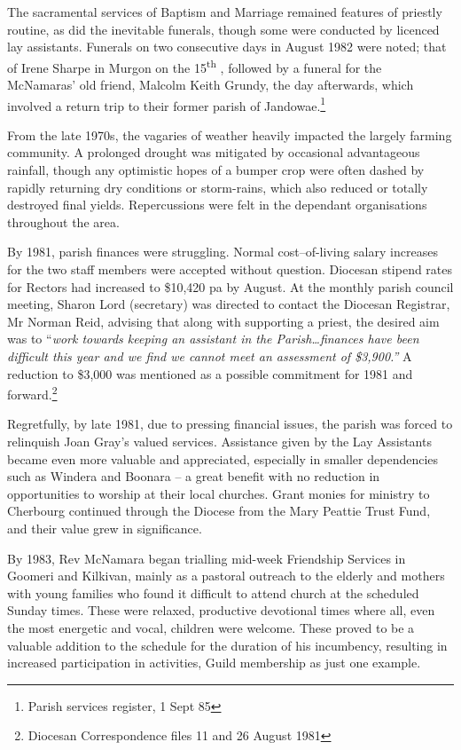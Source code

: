 The sacramental services of Baptism and Marriage remained features of priestly routine, as did the inevitable funerals, though some were conducted by licenced lay assistants. Funerals on two consecutive days in August 1982 were noted; that of Irene Sharpe in Murgon on the 15\textsuperscript{th} , followed by a funeral for the McNamaras' old friend, Malcolm Keith Grundy, the day afterwards, which involved a return trip to their former parish of Jandowae.\footnote{Parish services register, 1 Sept 85}


From the late 1970s, the vagaries of weather heavily impacted the largely farming community. A prolonged drought was mitigated by occasional advantageous rainfall, though any optimistic hopes of a bumper crop were often dashed by rapidly returning dry conditions or storm-rains, which also reduced or totally destroyed final yields. Repercussions were felt in the dependant organisations throughout the area.



By 1981, parish finances were struggling. Normal cost--of-living salary increases for the two staff members were accepted without question. Diocesan stipend rates for Rectors had increased to \$10,420 pa by August. At the monthly parish council meeting, Sharon Lord (secretary) was directed to contact the Diocesan Registrar, Mr Norman Reid, advising that along with supporting a priest, the desired aim was to ``\emph{work towards keeping an assistant in the Parish\ldots finances have been difficult this year and we find we cannot meet an assessment of \$3,900.''} A reduction to \$3,000 was mentioned as a possible commitment for 1981 and forward.\footnote{Diocesan Correspondence files 11 and 26 August 1981}


Regretfully, by late 1981, due to pressing financial issues, the parish was forced to relinquish Joan Gray's valued services. Assistance given by the Lay Assistants became even more valuable and appreciated, especially in smaller dependencies such as Windera and Boonara -- a great benefit with no reduction in opportunities to worship at their local churches. Grant monies for ministry to Cherbourg continued through the Diocese from the Mary Peattie Trust Fund, and their value grew in significance.



By 1983, Rev McNamara began trialling mid-week Friendship Services in Goomeri and Kilkivan, mainly as a pastoral outreach to the elderly and mothers with young families who found it difficult to attend church at the scheduled Sunday times. These were relaxed, productive devotional times where all, even the most energetic and vocal, children were welcome. These proved to be a valuable addition to the schedule for the duration of his incumbency, resulting in increased participation in activities, Guild membership as just one example.



